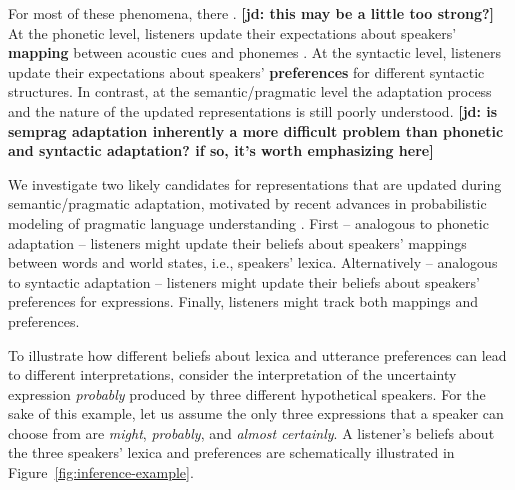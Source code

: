 \documentclass[lucida,biblatex]{sp} %
\newcommand{\jd}[1]{\textcolor{PinkyPurple}{\textbf{[jd: #1]}}}
\begin{document}
For most of these phenomena, there . \jd{this may be a little too strong?} At the phonetic level, 
listeners update their expectations about speakers' \textbf{mapping} between acoustic cues and phonemes \citep[e.g.,][]{Kleinschmidt2015}.
At the syntactic level, listeners update their expectations about speakers' \textbf{preferences} 
for different syntactic structures. In contrast, at the semantic/pragmatic level the adaptation process and the nature of the updated representations is still poorly understood. \jd{is semprag adaptation inherently a more difficult problem than phonetic and syntactic adaptation? if so, it's worth emphasizing here}

We investigate two likely candidates for representations that are updated during semantic/pragmatic adaptation, motivated by recent advances in probabilistic modeling of pragmatic language understanding \cite{FrankGoodman2012,GoodmanFrank2016,FrankeJaeger2016}. First -- analogous to phonetic adaptation -- listeners might update their beliefs about speakers' mappings between 
words and world states, i.e., speakers' lexica. Alternatively -- analogous to syntactic adaptation -- 
listeners might update their beliefs about speakers' preferences
for expressions. Finally, listeners might track both mappings and preferences.

To illustrate how different beliefs about lexica and utterance preferences can lead to different interpretations, consider the interpretation 
of the uncertainty expression \textit{probably} produced by three different hypothetical speakers. For the sake of this example, 
let us assume the only three expressions that a speaker can choose from are \textit{might}, \textit{probably}, and \textit{almost certainly}.
A listener's beliefs about the three speakers' lexica and preferences are schematically illustrated in Figure~\ref{fig:inference-example}.
\end{document}
